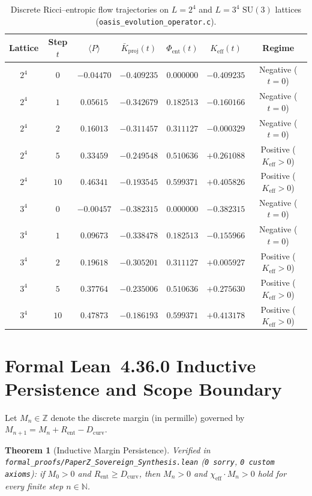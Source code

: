 \documentclass[11pt,a4paper]{article}
\newtheorem{theorem}{Theorem}[section]
\begin{document}
\begin{table}[h]
\centering
\begin{tabular}{ccccccc}
\hline
Lattice & Step $t$ & $\langle P \rangle$ & $\bar{K}_{\mathrm{proj}}(t)$ & $\Phi_{\mathrm{ent}}(t)$ & $K_{\mathrm{eff}}(t)$ & Regime \\
\hline
$2^4$ & $0$ & $-0.04470$ & $-0.409235$ & $0.000000$ & $-0.409235$ & Negative ($t=0$) \\
$2^4$ & $1$ & $0.05615$ & $-0.342679$ & $0.182513$ & $-0.160166$ & Negative ($t=0$) \\
$2^4$ & $2$ & $0.16013$ & $-0.311457$ & $0.311127$ & $-0.000329$ & Negative ($t=0$) \\
$2^4$ & $5$ & $0.33459$ & $-0.249548$ & $0.510636$ & $+0.261088$ & Positive ($K_{\mathrm{eff}}>0$) \\
$2^4$ & $10$ & $0.46341$ & $-0.193545$ & $0.599371$ & $+0.405826$ & Positive ($K_{\mathrm{eff}}>0$) \\
$3^4$ & $0$ & $-0.00457$ & $-0.382315$ & $0.000000$ & $-0.382315$ & Negative ($t=0$) \\
$3^4$ & $1$ & $0.09673$ & $-0.338478$ & $0.182513$ & $-0.155966$ & Negative ($t=0$) \\
$3^4$ & $2$ & $0.19618$ & $-0.305201$ & $0.311127$ & $+0.005927$ & Positive ($K_{\mathrm{eff}}>0$) \\
$3^4$ & $5$ & $0.37764$ & $-0.235006$ & $0.510636$ & $+0.275630$ & Positive ($K_{\mathrm{eff}}>0$) \\
$3^4$ & $10$ & $0.47873$ & $-0.186193$ & $0.599371$ & $+0.413178$ & Positive ($K_{\mathrm{eff}}>0$) \\
\hline
\end{tabular}
\caption{Discrete Ricci--entropic flow trajectories on $L=2^4$ and $L=3^4$ $\mathrm{SU}(3)$ lattices (\texttt{oasis\_evolution\_operator.c}).}
\label{tab:c99_evolution}
\end{table}

\section{Formal Lean~4.36.0 Inductive Persistence and Scope Boundary}
Let $M_n \in \mathbb{Z}$ denote the discrete margin (in permille) governed by $M_{n+1} = M_n + R_{\mathrm{ent}} - D_{\mathrm{curv}}$.
\begin{theorem}[Inductive Margin Persistence]
Verified in \texttt{formal\_proofs/PaperZ\_Sovereign\_Synthesis.lean} (\texttt{0 sorry}, \texttt{0 custom axioms}): if $M_0 > 0$ and $R_{\mathrm{ent}} \ge D_{\mathrm{curv}}$, then $M_n > 0$ and $\chi_{\mathrm{eff}} \cdot M_n > 0$ hold for every finite step $n \in \mathbb{N}$.
\end{theorem}
\end{document}
